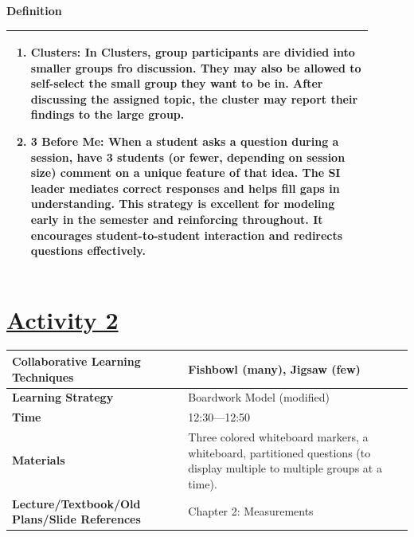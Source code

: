 \documentclass{article}
\begin{document}
{\large \textbf{Definition}} \\
\noindent
\begin{tabular}{|p{0.9\linewidth}|}
\begin{enumerate}
    \item \textbf{Clusters:} In Clusters, group participants are dividied into smaller groups fro discussion. They may also be allowed to self-select the small group they want to be in. After discussing the assigned topic, the cluster may report their findings to the large group.
    \item \textbf{3 Before Me:}  
    When a student asks a question during a session, have 3 students (or fewer, depending on session size) comment on a unique feature of that idea.  
    The SI leader mediates correct responses and helps fill gaps in understanding.  
    This strategy is excellent for modeling early in the semester and reinforcing throughout.  
    It encourages student-to-student interaction and redirects questions effectively.
\end{enumerate} \\
\hline
\end{tabular}
\vspace{0.2cm}
\newpage

\noindent
\section*{\underline{Activity 2}}
\begin{tabular}{|p{4.2cm}|p{9.8cm}|}
\hline
\textbf{Collaborative Learning Techniques} & Fishbowl (many), Jigsaw (few) \\
\hline
\textbf{Learning Strategy} &  Boardwork Model (modified) \\
\hline
\textbf{Time} & 12:30---12:50 \\
\hline
\textbf{Materials} & Three colored whiteboard markers, a whiteboard, partitioned questions (to display multiple to multiple groups at a time). \\
\hline
\textbf{Lecture/Textbook/Old Plans/Slide References} & Chapter 2: Measurements \\
\hline
\end{tabular}
\end{document}
